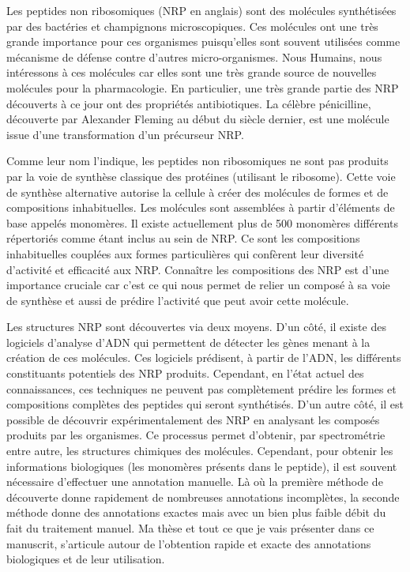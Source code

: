 Les peptides non ribosomiques (NRP en anglais) sont des molécules synthétisées par des bactéries et champignons microscopiques.
Ces molécules ont une très grande importance pour ces organismes puisqu'elles sont souvent utilisées comme mécanisme de défense contre d'autres micro-organismes.
Nous Humains, nous intéressons à ces molécules car elles sont une très grande source de nouvelles molécules pour la pharmacologie.
En particulier, une très grande partie des NRP découverts à ce jour ont des propriétés antibiotiques.
La célèbre pénicilline, découverte par Alexander Fleming au début du siècle dernier, est une molécule issue d'une transformation d'un précurseur NRP.

Comme leur nom l'indique, les peptides non ribosomiques ne sont pas produits par la voie de synthèse classique des protéines (utilisant le ribosome).
Cette voie de synthèse alternative autorise la cellule à créer des molécules de formes et de compositions inhabituelles.
Les molécules sont assemblées à partir d'éléments de base appelés monomères.
Il existe actuellement plus de 500 monomères différents répertoriés comme étant inclus au sein de NRP.
Ce sont les compositions inhabituelles couplées aux formes particulières qui confèrent leur diversité d'activité et efficacité aux NRP.
Connaître les compositions des NRP est d'une importance cruciale car c'est ce qui nous permet de relier un composé à sa voie de synthèse et aussi de prédire l'activité que peut avoir cette molécule.

Les structures NRP sont découvertes via deux moyens.
D'un côté, il existe des logiciels d'analyse d'ADN qui permettent de détecter les gènes menant à la création de ces molécules.
Ces logiciels prédisent, à partir de l'ADN, les différents constituants potentiels des NRP produits.
Cependant, en l'état actuel des connaissances, ces techniques ne peuvent pas complètement prédire les formes et compositions complètes des peptides qui seront synthétisés.
D'un autre côté, il est possible de découvrir expérimentalement des NRP en analysant les composés produits par les organismes.
Ce processus permet d'obtenir, par spectrométrie entre autre, les structures chimiques des molécules.
Cependant, pour obtenir les informations biologiques (les monomères présents dans le peptide), il est souvent nécessaire d'effectuer une annotation manuelle.
Là où la première méthode de découverte donne rapidement de nombreuses annotations incomplètes, la seconde méthode donne des annotations exactes mais avec un bien plus faible débit du fait du traitement manuel.
Ma thèse et tout ce que je vais présenter dans ce manuscrit, s'articule autour de l'obtention rapide et exacte des annotations biologiques et de leur utilisation.

